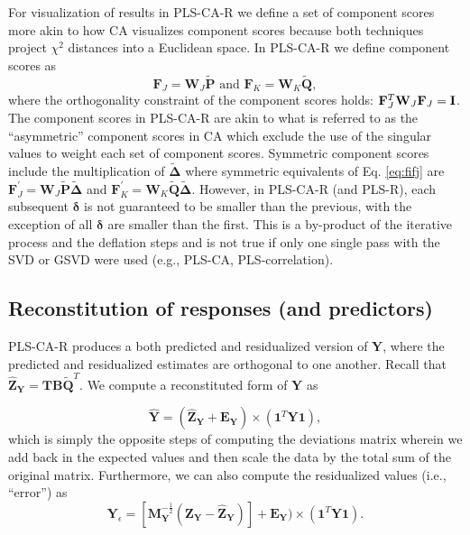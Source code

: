 \documentclass[12pt]{article}
\begin{document}
For visualization of results in PLS-CA-R we define a set of component
scores more akin to how CA visualizes component scores because both
techniques project \(\chi^2\) distances into a Euclidean space. In
PLS-CA-R we define component scores as \begin{equation}
{\mathbf F}_{J} = {\mathbf W}_{J}\widetilde{\mathbf P} \textrm{ and } {\mathbf F}_{K} = {\mathbf W}_{K}\widetilde{\mathbf Q},
\label{eq:fifj}
\end{equation} where the orthogonality constraint of the component
scores holds:
\({\mathbf F}_{J}^{T}{\mathbf W}_{J}{\mathbf F}_{J} = {\bf I}\). The
component scores in PLS-CA-R are akin to what is referred to as the
``asymmetric'' component scores in CA which exclude the use of the
singular values to weight each set of component scores. Symmetric
component scores include the multiplication of
\(\widetilde{\boldsymbol \Delta}\) where symmetric equivalents of Eq.
\ref{eq:fifj} are
\({\mathbf F}^{'}_{J} = {\mathbf W}_{J}\widetilde{\mathbf P}\widetilde{\boldsymbol \Delta}\)
and
\({\mathbf F}^{'}_{K} = {\mathbf W}_{K}\widetilde{\mathbf Q}\widetilde{\boldsymbol \Delta}\).
However, in PLS-CA-R (and PLS-R), each subsequent \(\boldsymbol \delta\)
is not guaranteed to be smaller than the previous, with the exception of
all \(\boldsymbol \delta\) are smaller than the first. This is a
by-product of the iterative process and the deflation steps and is not
true if only one single pass with the SVD or GSVD were used (e.g.,
PLS-CA, PLS-correlation).

\hypertarget{reconstitution-of-responses-and-predictors}{%
\subsection{Reconstitution of responses (and
predictors)}\label{reconstitution-of-responses-and-predictors}}

\label{section:recresp}

PLS-CA-R produces a both predicted and residualized version of
\({\mathbf Y}\), where the predicted and residualized estimates are
orthogonal to one another. Recall that
\(\widehat{{\mathbf Z}}_{\mathbf Y} = {\mathbf T} {\mathbf B}\widetilde{\mathbf Q}^{T}\).
We compute a reconstituted form of \({\mathbf Y}\) as

\begin{equation}
\widehat{\mathbf Y} = (\widehat{{\mathbf Z}}_{\mathbf Y} + {\mathbf E}_{\mathbf Y}) \times ({\mathbf 1}^{T}{\mathbf Y}{\mathbf 1}),
\label{eq:Yhat}
\end{equation} which is simply the opposite steps of computing the
deviations matrix wherein we add back in the expected values and then
scale the data by the total sum of the original matrix. Furthermore, we
can also compute the residualized values (i.e., ``error'') as
\begin{equation}
{\mathbf Y}_{\epsilon} = [ {\mathbf M}_{\mathbf Y}^{-\frac{1}{2}}({\mathbf Z}_{\mathbf Y} - \widehat{{\mathbf Z}}_{\mathbf Y})] + {\mathbf E}_{\mathbf Y}) \times ({\mathbf 1}^{T}{\mathbf Y}{\mathbf 1}).
\label{eq:Yresid}
\end{equation}
\end{document}
